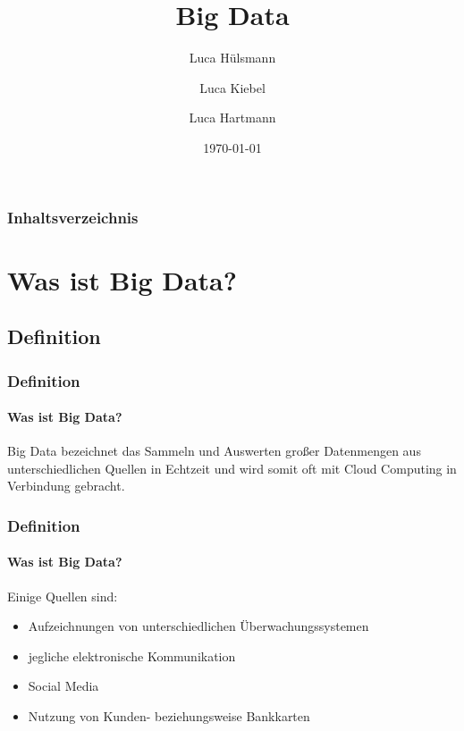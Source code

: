 \documentclass[10pt,a4paper]{beamer}
\author{Luca Hülsmann \and Luca Kiebel \and Luca Hartmann}
\title{Big Data}
\date{\today}
\begin{document}
\begin{frame}
\titlepage
\end{frame}

\begin{frame}
\frametitle{Inhaltsverzeichnis}\tableofcontents
\end{frame}

\section{Was ist Big Data?}
\subsection{Definition}
\begin{frame}
\frametitle{Definition}
\framesubtitle{Was ist Big Data?}
Big Data bezeichnet das Sammeln und Auswerten großer Datenmengen aus unterschiedlichen Quellen in Echtzeit und wird somit oft mit Cloud Computing in Verbindung gebracht.
\end{frame}
\begin{frame}
\frametitle{Definition}
\framesubtitle{Was ist Big Data?}
Einige Quellen sind:
\begin{itemize}
	\item Aufzeichnungen von unterschiedlichen Überwachungssystemen \pause
	\item jegliche elektronische Kommunikation \pause
	\item Social Media \pause
	\item Nutzung von Kunden- beziehungsweise Bankkarten
\end{itemize}
\end{frame}
\end{document}
